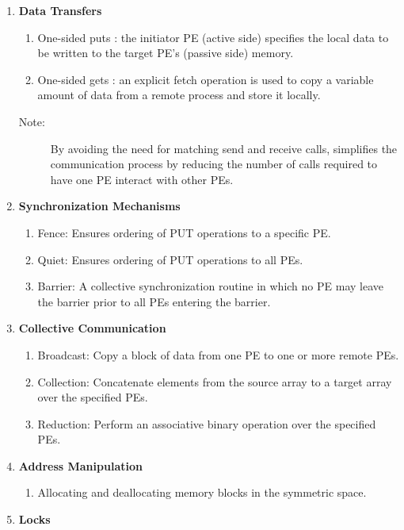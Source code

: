 \begin{enumerate}
\item \textbf{Data Transfers }

\begin{enumerate}
\item One-sided puts : the initiator \ac{PE} (active side) specifies the local
data to be written to the target \ac{PE}'s (passive side) memory. 
\item One-sided gets : an explicit fetch operation is used to copy a variable
amount of data from a remote process and store it locally.\end{enumerate}
\begin{description}
\item [{{Note:}}] By avoiding the need for matching send and receive
calls, \openshmem{}simplifies the communication process by reducing the
number of calls required to have one \ac{PE} interact with other \ac{PE}s. 
\end{description}
\item \textbf{Synchronization Mechanisms }

\begin{enumerate}
\item Fence: Ensures ordering of PUT operations to a specific \ac{PE}. 
\item Quiet: Ensures ordering of PUT operations to all \ac{PE}s. 
\item Barrier: A collective synchronization routine in which no \ac{PE} may leave
the barrier prior to all \ac{PE}s entering the barrier. 
\end{enumerate}
\item \textbf{Collective Communication}

\begin{enumerate}
\item Broadcast: Copy a block of data from one \ac{PE} to one or more remote
\ac{PE}s. 
\item Collection: Concatenate elements from the source array to a target
array over the specified \ac{PE}s. 
\item Reduction: Perform an associative binary operation over the specified
\ac{PE}s. 
\end{enumerate}
\item \textbf{Address Manipulation}

\begin{enumerate}
\item Allocating and deallocating memory blocks in the symmetric space.
\end{enumerate}
\item \textbf{Locks}


\end{enumerate}
